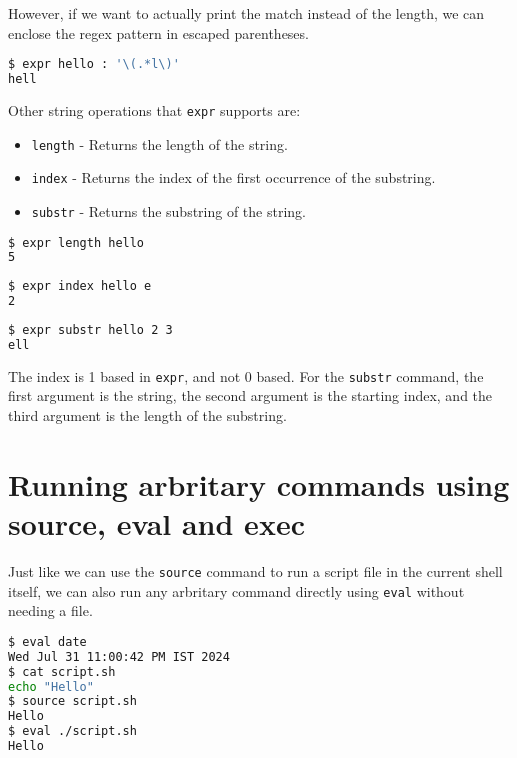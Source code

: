 However, if we want to actually print the match instead of the length, we can
enclose the regex pattern in escaped parentheses.

\begin{lstlisting}[language=bash]
$ expr hello : '\(.*l\)'
hell
\end{lstlisting}

Other string operations that \lstinline|expr| supports are:

\begin{itemize}
  \item \lstinline|length| - Returns the length of the string.
  \item \lstinline|index| - Returns the index of the first occurrence of the substring.
  \item \lstinline|substr| - Returns the substring of the string.
\end{itemize}

\begin{lstlisting}[language=bash]
$ expr length hello
5
\end{lstlisting}

\begin{lstlisting}[language=bash]
$ expr index hello e
2
\end{lstlisting}

\begin{lstlisting}[language=bash]
$ expr substr hello 2 3
ell
\end{lstlisting}

The index is 1 based in \lstinline|expr|, and not 0 based.
For the \lstinline|substr| command, the first argument is the string, the second argument is the starting index, and the third argument is the length of the substring.

\section{Running arbritary commands using source, eval and exec}

Just like we can use the \lstinline|source| command to run a script file in the current shell itself, we can also run any arbritary command directly using \lstinline|eval| without needing a file.

\begin{lstlisting}[language=bash]
$ eval date
Wed Jul 31 11:00:42 PM IST 2024
$ cat script.sh
echo "Hello"
$ source script.sh
Hello
$ eval ./script.sh
Hello
\end{lstlisting}

